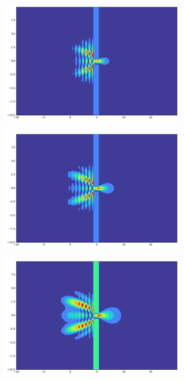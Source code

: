 \begin{figure}[h]
\begin{subfigure}{0.3\linewidth}
    \end{subfigure}
    \begin{subfigure}{0.3\linewidth}
        \includegraphics[width=\linewidth]{5/600}
    \end{subfigure}
    \begin{subfigure}{0.3\linewidth}
        \includegraphics[width=\linewidth]{5/700}
    \end{subfigure}
    \begin{subfigure}{0.3\linewidth}
        \includegraphics[width=\linewidth]{5/800}

\end{subfigure}
\end{figure}
